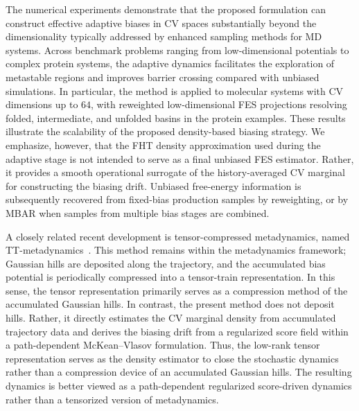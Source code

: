 \documentclass[a4paper,fleqn]{cas-sc}
\theoremstyle{definition}
\begin{document}
The numerical experiments demonstrate that the proposed formulation can construct effective adaptive biases in CV spaces substantially beyond the dimensionality typically addressed by enhanced sampling methods for MD systems. Across benchmark problems ranging from low-dimensional potentials to complex protein systems, the adaptive dynamics facilitates the exploration of metastable regions and improves barrier crossing compared with unbiased simulations. 
%
In particular, the method is applied to molecular systems with CV dimensions up to \(64\), with reweighted low-dimensional FES projections resolving folded, intermediate, and unfolded basins in the protein examples. 
These results illustrate the scalability of the proposed density-based biasing strategy.
%
We emphasize, however, that the FHT density approximation used during the adaptive stage is not intended to serve as a final unbiased FES estimator. 
Rather, it provides a smooth operational surrogate of the history-averaged CV marginal for constructing the biasing drift. 
Unbiased free-energy information is subsequently recovered from fixed-bias production samples by reweighting, or by MBAR when samples from multiple bias stages are combined.



A closely related recent development is tensor-compressed metadynamics, named TT-metadynamics~\cite{strand2026adaptive}. This method remains within the metadynamics framework; Gaussian hills are deposited along the trajectory, and the accumulated bias potential is periodically compressed into a tensor-train representation. In this sense, the tensor representation primarily serves as a compression method of the accumulated Gaussian hills. In contrast, the present method does not deposit hills. Rather, it directly estimates the CV marginal density from accumulated trajectory data and derives the biasing drift from a regularized score field within a path-dependent McKean--Vlasov formulation. Thus, the low-rank tensor representation serves as the density estimator to close the stochastic dynamics rather than a compression device of an accumulated Gaussian hills. The resulting dynamics is better viewed as a path-dependent regularized score-driven dynamics rather than a tensorized version of metadynamics. 
\end{document}
